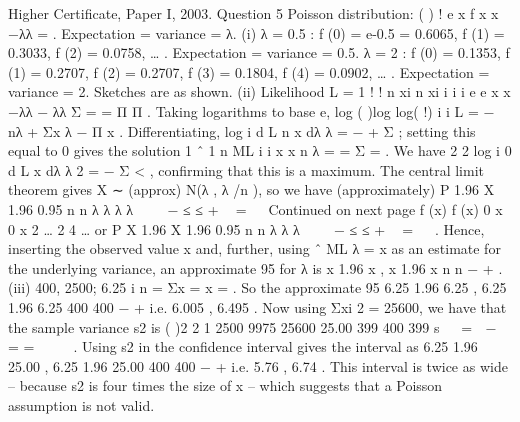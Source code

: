 \documentclass[a4paper,12pt]{article}
\begin{document}
Higher Certificate, Paper I, 2003. Question 5
Poisson distribution: ( ) !
e x f x
x
−λλ
= . Expectation = variance = λ.
(i) λ = 0.5 : f (0) = e-0.5 = 0.6065, f (1) = 0.3033, f (2) = 0.0758, … .
Expectation = variance = 0.5.
λ = 2 : f (0) = 0.1353, f (1) = 0.2707, f (2) = 0.2707, f (3) = 0.1804,
f (4) = 0.0902, … . Expectation = variance = 2.
Sketches are as shown.
(ii) Likelihood L =
1 ! !
n xi n xi
i i i
e e
x x
−λλ − λλ Σ
=
=
Π Π .
Taking logarithms to base e,
log ( )log log( !) i i L = − nλ + Σx λ − Π x .
Differentiating, log i d L n x
dλ λ
= − + Σ ; setting this equal to 0 gives the solution
1
ˆ 1 n
ML i
i
x x
n
λ
=
= Σ = . We have
2
2
log i 0 d L x
dλ λ 2
= − Σ < , confirming that this is
a maximum.
The central limit theorem gives X ∼ (approx) N(λ , λ /n ), so we have
(approximately)
P 1.96 X 1.96 0.95
n n
λ λ λ λ
 
 − ≤ ≤ +  =
 
Continued on next page
f (x) f (x)
0 x 0 x 2 … 2 4 …
or
P X 1.96 X 1.96 0.95
n n
λ λ λ
 
 − ≤ ≤ +  =
 
.
Hence, inserting the observed value x and, further, using ˆ
ML λ = x as an
estimate for the underlying variance, an approximate 95%
for λ is
x 1.96 x , x 1.96 x
n n
− + .
(iii) 400, 2500; 6.25 i n = Σx = x = .
So the approximate 95%
6.25 1.96 6.25 , 6.25 1.96 6.25
400 400
− +
i.e. 6.005 , 6.495 .
Now using Σxi
2 = 25600, we have that the sample variance s2 is
( )2
2 1 2500 9975 25600 25.00
399 400 399
s
 
=  −  = =
 
 
.
Using s2 in the confidence interval gives the interval as
6.25 1.96 25.00 , 6.25 1.96 25.00
400 400
− +
i.e. 5.76 , 6.74 .
This interval is twice as wide – because s2 is four times the size of x – which
suggests that a Poisson assumption is not valid.
\end{document}
